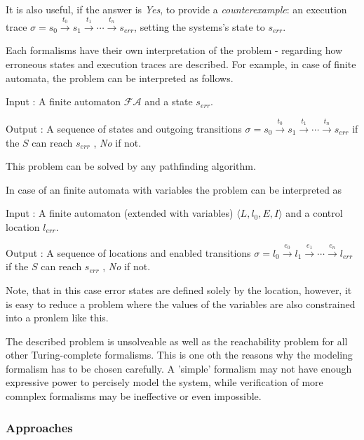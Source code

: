 It is also useful, if the answer is \emph{Yes}, to provide a \emph{counterexample}: an execution trace $\sigma = s_0 \xrightarrow{t_0} s_1 \xrightarrow{t_1} \cdots \xrightarrow{t_n} s_{err}$, setting the systems's state to $s_{err}$. 

Each formalisms have their own interpretation of the problem - regarding how erroneous states and execution traces are described. For example, in case of finite automata, the problem can be interpreted as follows. 

\begin{descripton}
	\item[Input]: A finite automaton $\mathcal{FA}$ and a state $s_{err}$.
	\item[Output]: A sequence of states and outgoing transitions $\sigma = s_0 \xrightarrow{t_0} s_1 \xrightarrow{t_1} \cdots \xrightarrow{t_n} s_{err}$ if the $S$ can reach $s_{err}$ , \emph{No} if not.
\end{descripton}

This problem can be solved by any pathfinding algorithm.

In case of an finite automata with variables the problem can be interpreted as 
\begin{descripton}
	\item[Input]: A finite automaton (extended with variables) $\langle L,l_0, E, I\rangle$ and a control location $l_{err}$.
	\item[Output]: A sequence of locations and enabled transitions $\sigma = l_0 \xrightarrow{e_0} l_1 \xrightarrow{e_1} \cdots \xrightarrow{e_n} l_{err}$ if the $S$ can reach $s_{err}$ , \emph{No} if not.
\end{descripton}

Note, that in this case error states are defined solely by the location, however, it is easy to reduce a problem where the values of the variables are also constrained into a pronlem like this.

The described problem is unsolveable as well as the reachability problem for all other Turing-complete formalisms. This is one oth the reasons why the modeling formalism has to be chosen carefully. A 'simple' formalism may not have enough expressive power to percisely model the system, while verification of more comnplex formalisms may be ineffective or even impossible.

\subsubsection{Approaches}

